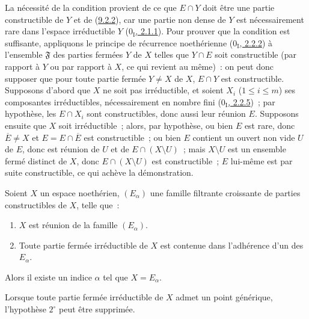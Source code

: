 La nécessité de la condition provient de ce que $E\cap Y$ doit être une
partie constructible de $Y$ et de (\hyperref[0.9.2.2-fr]{9.2.2}), car une
partie non dense de $Y$ est nécessairement rare dans l'espace irréductible
$Y$ (\hyperref[0.2.1.1-fr]{$0_{\mathrm I}$, 2.1.1}). Pour prouver que la
condition est suffisante, appliquons le principe de récurrence noethérienne
(\hyperref[0.2.2.2-fr]{$0_{\mathrm I}$, 2.2.2}) à l'ensemble
$\mathfrak{F}$ des parties fermées $Y$ de $X$ telles que $Y\cap E$ soit
constructible (par rapport à $Y$ ou par rapport à $X$, ce qui revient au
même)~: on peut donc supposer que pour toute partie fermée $Y\ne X$ de $X$,
$E\cap Y$ est constructible. Supposons d'abord que $X$ ne soit pas
irréductible, et soient $X_i$ ($1\leq i\leq m$) ses composantes
irréductibles, nécessairement en nombre fini
(\hyperref[0.2.2.5-fr]{$0_{\mathrm I}$, 2.2.5})~; par hypothèse, les
$E\cap X_i$ sont constructibles, donc aussi leur réunion $E$. Supposons
ensuite que $X$ soit irréductible~; alors, par hypothèse, ou bien $E$ est
rare, donc $\overline{E}\ne X$ et $E=E\cap\overline{E}$ est constructible~;
ou bien $E$ contient un ouvert non vide $U$ de $E$, donc est réunion de $U$
et de $E\cap(X\setminus U)$~; mais $X\setminus U$ est un ensemble fermé
distinct de $X$, donc $E\cap(X\setminus U)$ est constructible~; $E$
lui-même est par suite constructible, ce qui achève la démonstration.

\begin{corollary}[9.2.4]
\label{0.9.2.4-fr}
Soient $X$ un espace noethérien, $(E_\alpha)$ une famille filtrante
croissante de parties constructibles de $X$, telle que~:
\begin{enumerate}
  \item[$1^\circ$] $X$ est réunion de la famille $(E_\alpha)$.
  \item[$2^\circ$] Toute partie fermée irréductible de $X$ est contenue dans
    l'adhérence d'un des $E_\alpha$.
\end{enumerate}
Alors il existe un indice $\alpha$ tel que $X=E_\alpha$.

Lorsque toute partie fermée irréductible de $X$ admet un point générique,
l'hypothèse $2^\circ$ peut être supprimée.
\end{corollary}

